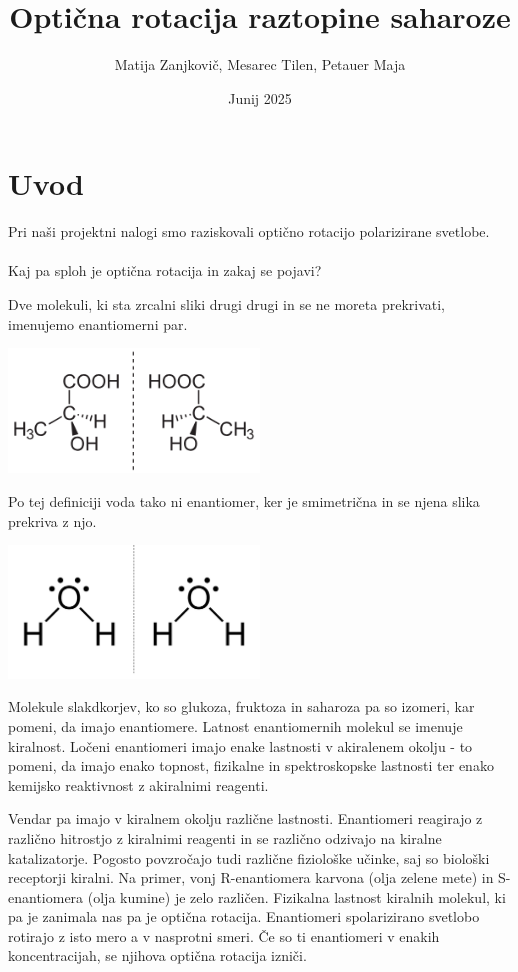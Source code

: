 \documentclass[20pt]{extarticle}
\title{Optična rotacija raztopine saharoze}
\author{Matija Zanjkovič, Mesarec Tilen, Petauer Maja}
\date{Junij 2025}
\begin{document}
\maketitle

\section*{Uvod}

Pri naši projektni nalogi smo raziskovali optično rotacijo polarizirane svetlobe. \\\\

Kaj pa sploh je optična rotacija in zakaj se pojavi?

Dve molekuli, ki sta zrcalni sliki drugi drugi in se ne moreta prekrivati, imenujemo enantiomerni par.
\begin{center}
    \includegraphics[width=0.5\textwidth]{slike/enantiomer.png}
\end{center}

Po tej definiciji voda tako ni enantiomer, ker je smimetrična in se njena slika prekriva z njo.
\begin{center}
    \includegraphics[width=0.5\textwidth]{slike/voda.png}
\end{center}

Molekule slakdkorjev, ko so glukoza, fruktoza in saharoza pa so izomeri, kar pomeni, da imajo enantiomere. Latnost enantiomernih molekul 
se imenuje kiralnost.
Ločeni enantiomeri imajo enake lastnosti v akiralenem okolju - to pomeni, da imajo enako topnost, fizikalne in spektroskopske lastnosti ter enako kemijsko reaktivnost z akiralnimi reagenti.

Vendar pa imajo v kiralnem okolju različne lastnosti. Enantiomeri reagirajo z različno hitrostjo z kiralnimi reagenti in se različno odzivajo na kiralne katalizatorje. Pogosto povzročajo tudi različne fiziološke učinke, saj so biološki receptorji kiralni.
Na primer, vonj R-enantiomera karvona (olja zelene mete) in S-enantiomera (olja kumine) je zelo različen. Fizikalna lastnost kiralnih molekul, ki pa je zanimala nas pa je optična rotacija.
Enantiomeri spolarizirano svetlobo rotirajo z isto mero a v nasprotni smeri. Če so ti enantiomeri v enakih koncentracijah, se njihova optična rotacija izniči.
\end{document}
